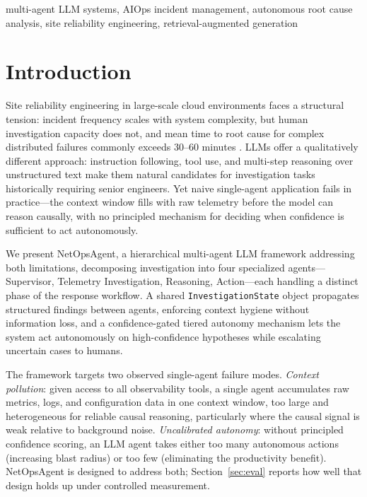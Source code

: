 \documentclass[10pt,conference]{IEEEtran}
\begin{document}
\begin{IEEEkeywords}
multi-agent LLM systems, AIOps incident management, autonomous root cause
analysis, site reliability engineering, retrieval-augmented generation
\end{IEEEkeywords}

\section{Introduction}
\label{sec:intro}

Site reliability engineering in large-scale cloud environments faces a
structural tension: incident frequency scales with system complexity, but
human investigation capacity does not, and mean time to root cause for
complex distributed failures commonly exceeds 30--60 minutes
\cite{beyer2016sre,lim2018oncall}. LLMs offer a qualitatively different
approach: instruction following, tool use, and multi-step reasoning over
unstructured text make them natural candidates for investigation tasks
historically requiring senior engineers. Yet naive single-agent application
fails in practice---the context window fills with raw telemetry before the
model can reason causally, with no principled mechanism for deciding when
confidence is sufficient to act autonomously.

We present NetOpsAgent, a hierarchical multi-agent LLM framework
addressing both limitations, decomposing investigation into four
specialized agents---Supervisor, Telemetry Investigation, Reasoning,
Action---each handling a distinct phase of the response workflow. A shared
\texttt{InvestigationState} object propagates structured findings between
agents, enforcing context hygiene without information loss, and a
confidence-gated tiered autonomy mechanism lets the system act
autonomously on high-confidence hypotheses while escalating uncertain
cases to humans.

The framework targets two observed single-agent failure modes.
\emph{Context pollution}: given access to all observability tools, a single
agent accumulates raw metrics, logs, and configuration data in one context
window, too large and heterogeneous for reliable causal reasoning,
particularly where the causal signal is weak relative to background noise.
\emph{Uncalibrated autonomy}: without principled confidence scoring, an LLM
agent takes either too many autonomous actions (increasing blast radius) or
too few (eliminating the productivity benefit). NetOpsAgent is designed to
address both; Section~\ref{sec:eval} reports how well that design holds up
under controlled measurement.
\end{document}
